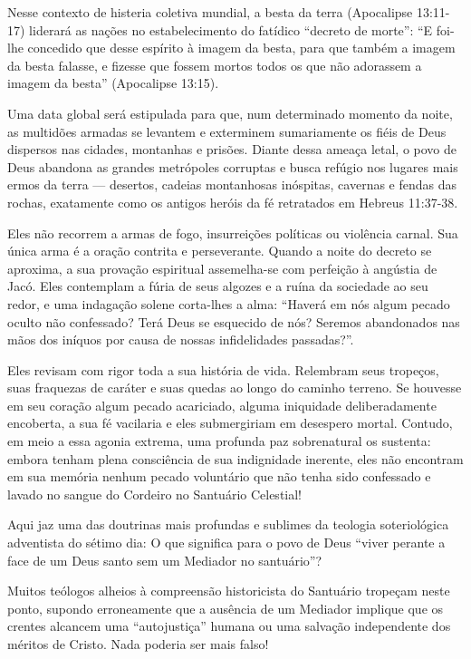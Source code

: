 \documentclass[11pt,a4paper,openany]{book}
\begin{document}
Nesse contexto de histeria coletiva mundial, a besta da terra (Apocalipse 13:11-17) liderará as nações no estabelecimento do fatídico ``decreto de morte'':
``E foi-lhe concedido que desse espírito à imagem da besta, para que também a imagem da besta falasse, e fizesse que fossem mortos todos os que não adorassem a imagem da besta'' (Apocalipse 13:15).

Uma data global será estipulada para que, num determinado momento da noite, as multidões armadas se levantem e exterminem sumariamente os fiéis de Deus dispersos nas cidades, montanhas e prisões. Diante dessa ameaça letal, o povo de Deus abandona as grandes metrópoles corruptas e busca refúgio nos lugares mais ermos da terra — desertos, cadeias montanhosas inóspitas, cavernas e fendas das rochas, exatamente como os antigos heróis da fé retratados em Hebreus 11:37-38.

Eles não recorrem a armas de fogo, insurreições políticas ou violência carnal. Sua única arma é a oração contrita e perseverante. Quando a noite do decreto se aproxima, a sua provação espiritual assemelha-se com perfeição à angústia de Jacó. Eles contemplam a fúria de seus algozes e a ruína da sociedade ao seu redor, e uma indagação solene corta-lhes a alma: ``Haverá em nós algum pecado oculto não confessado? Terá Deus se esquecido de nós? Seremos abandonados nas mãos dos iníquos por causa de nossas infidelidades passadas?''.

Eles revisam com rigor toda a sua história de vida. Relembram seus tropeços, suas fraquezas de caráter e suas quedas ao longo do caminho terreno. Se houvesse em seu coração algum pecado acariciado, alguma iniquidade deliberadamente encoberta, a sua fé vacilaria e eles submergiriam em desespero mortal. Contudo, em meio a essa agonia extrema, uma profunda paz sobrenatural os sustenta: embora tenham plena consciência de sua indignidade inerente, eles não encontram em sua memória nenhum pecado voluntário que não tenha sido confessado e lavado no sangue do Cordeiro no Santuário Celestial!

Aqui jaz uma das doutrinas mais profundas e sublimes da teologia soteriológica adventista do sétimo dia: O que significa para o povo de Deus ``viver perante a face de um Deus santo sem um Mediador no santuário''?

Muitos teólogos alheios à compreensão historicista do Santuário tropeçam neste ponto, supondo erroneamente que a ausência de um Mediador implique que os crentes alcancem uma ``autojustiça'' humana ou uma salvação independente dos méritos de Cristo. Nada poderia ser mais falso!
\end{document}
